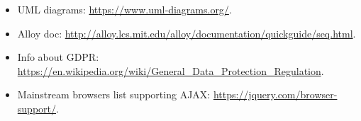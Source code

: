 \begin{itemize}
	\item UML diagrams: \url{https://www.uml‐diagrams.org/}.
    \item Alloy doc: \url{http://alloy.lcs.mit.edu/alloy/documentation/quickguide/seq.html}.
    \item Info about GDPR: \url{https://en.wikipedia.org/wiki/General_Data_Protection_Regulation}.
    \item Mainstream browsers list supporting AJAX: \url{https://jquery.com/browser-support/}.
\end{itemize}